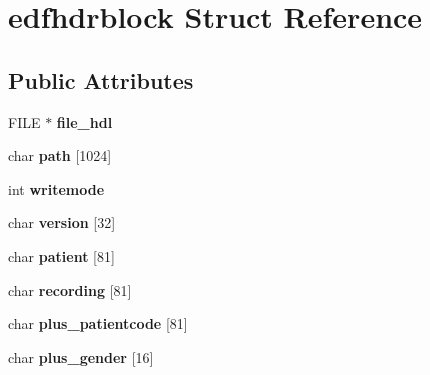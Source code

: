 \hypertarget{structedfhdrblock}{}\section{edfhdrblock Struct Reference}
\label{structedfhdrblock}
\subsection*{Public Attributes}
\begin{DoxyCompactItemize}
\item 
\hypertarget{structedfhdrblock_a6571db3106e0128e983812a269fd34f7}{}F\+I\+L\+E $\ast$ {\bfseries file\+\_\+hdl}\label{structedfhdrblock_a6571db3106e0128e983812a269fd34f7}

\item 
\hypertarget{structedfhdrblock_a077ba77f41b110ed841ce4bae11914a5}{}char {\bfseries path} \mbox{[}1024\mbox{]}\label{structedfhdrblock_a077ba77f41b110ed841ce4bae11914a5}

\item 
\hypertarget{structedfhdrblock_a70625768c7ea0400b7036801669eb063}{}int {\bfseries writemode}\label{structedfhdrblock_a70625768c7ea0400b7036801669eb063}

\item 
\hypertarget{structedfhdrblock_a907ec608968e5aa632bb97c0090c9a2a}{}char {\bfseries version} \mbox{[}32\mbox{]}\label{structedfhdrblock_a907ec608968e5aa632bb97c0090c9a2a}

\item 
\hypertarget{structedfhdrblock_a002c807038f2c3246fe4e7435c89dd99}{}char {\bfseries patient} \mbox{[}81\mbox{]}\label{structedfhdrblock_a002c807038f2c3246fe4e7435c89dd99}

\item 
\hypertarget{structedfhdrblock_a570bf406bb3b22aa68d96933a04a6539}{}char {\bfseries recording} \mbox{[}81\mbox{]}\label{structedfhdrblock_a570bf406bb3b22aa68d96933a04a6539}

\item 
\hypertarget{structedfhdrblock_a72748e946a4767dc6121fa7b833bbfa6}{}char {\bfseries plus\+\_\+patientcode} \mbox{[}81\mbox{]}\label{structedfhdrblock_a72748e946a4767dc6121fa7b833bbfa6}

\item 
\hypertarget{structedfhdrblock_ae4d72608c6bd8c9f2eebea14e380884e}{}char {\bfseries plus\+\_\+gender} \mbox{[}16\mbox{]}\label{structedfhdrblock_ae4d72608c6bd8c9f2eebea14e380884e}


\end{DoxyCompactItemize}
